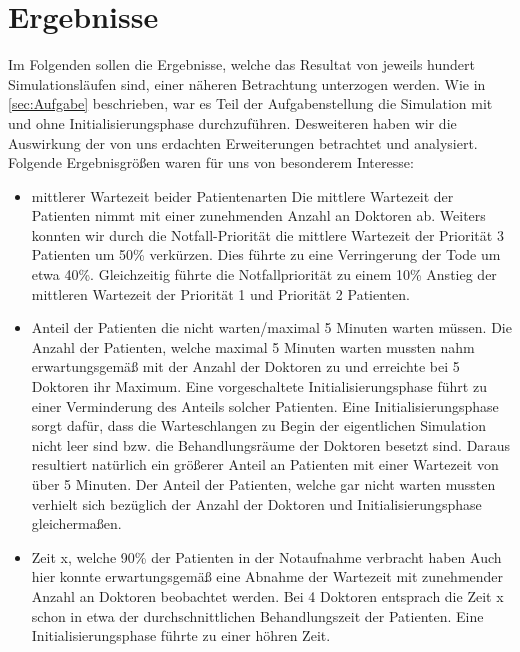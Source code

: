 \documentclass[12pt,fleqn,a4paper]{article}
\begin{document}
\section{Ergebnisse}
Im Folgenden sollen die Ergebnisse, welche das Resultat von jeweils hundert Simulationsl\"{a}ufen sind, einer n\"{a}heren Betrachtung unterzogen werden.
Wie in \ref{sec:Aufgabe} beschrieben, war es Teil der Aufgabenstellung die Simulation mit und ohne Initialisierungsphase durchzuf\"{u}hren.
Desweiteren haben wir die Auswirkung  der von uns erdachten Erweiterungen betrachtet und analysiert.
Folgende Ergebnisgr\"{o}{\ss}en waren f\"{u}r uns von besonderem Interesse:
\begin{itemize}

	\item mittlerer Wartezeit beider Patientenarten\newline
	Die mittlere Wartezeit der Patienten nimmt mit einer zunehmenden Anzahl an Doktoren ab.
	Weiters konnten wir durch die Notfall-Priorit\"{a}t die mittlere Wartezeit der Priorit\"{a}t 3 Patienten um 50\% verk\"{u}rzen. Dies f\"{u}hrte zu eine
	Verringerung der Tode um etwa 40\%. Gleichzeitig f\"{u}hrte die Notfallpriorit\"{a}t zu einem 10\% Anstieg der mittleren Wartezeit der Priorit\"{a}t 1 und Priorit\"{a}t 2 Patienten. 
	
	\item Anteil der Patienten die nicht warten/maximal 5 Minuten warten m\"{u}ssen.\newline
	Die Anzahl der Patienten, welche maximal 5 Minuten warten mussten nahm erwartungsgem\"{a}{\ss} mit der Anzahl der Doktoren zu und erreichte bei 5 Doktoren ihr Maximum. Eine vorgeschaltete Initialisierungsphase f\"{u}hrt zu einer Verminderung des Anteils solcher Patienten.
Eine Initialisierungsphase sorgt daf\"{u}r, dass die Warteschlangen zu Begin der eigentlichen Simulation nicht leer sind bzw.
 die Behandlungsr\"{a}ume der Doktoren besetzt sind. Daraus resultiert nat\"{u}rlich ein gr\"{o}{\ss}erer Anteil an Patienten mit einer Wartezeit von \"{u}ber 5 Minuten. 
	Der Anteil der Patienten, welche gar nicht warten mussten verhielt sich bez\"{u}glich der Anzahl der Doktoren und Initialisierungsphase gleicherma{\ss}en.

	\item Zeit x, welche 90\% der Patienten in der Notaufnahme verbracht haben \newline
	Auch hier konnte erwartungsgem\"{a}{\ss} eine Abnahme der Wartezeit mit zunehmender Anzahl an Doktoren beobachtet werden. Bei 4 Doktoren entsprach die Zeit x schon in etwa der durchschnittlichen Behandlungszeit der Patienten. 
Eine Initialisierungsphase f\"{u}hrte zu einer h\"{o}hren Zeit.


\end{itemize}
\end{document}
